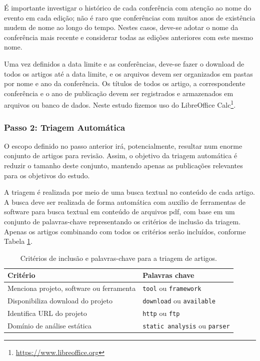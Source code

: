 É importante investigar o histórico de cada conferência com atenção ao nome do
evento em cada edição; não é raro que conferências com muitos anos de
existência mudem de nome ao longo do tempo. Nestes casos, deve-se adotar o nome
da conferência mais recente e considerar todas as edições anteriores com este
mesmo nome.

Uma vez definidos a data limite e as conferências, deve-se fazer o download de
todos os artigos até a data limite, e os arquivos devem ser organizados em pastas
por nome e ano da conferência. Os títulos de todos os artigo, a correspondente
conferência e o ano de publicação devem ser registrados e armazenados em
arquivos ou banco de dados. Neste estudo fizemos uso do
LibreOffice Calc\footnote{\url{https://www.libreoffice.org}}.

\subsubsection{Passo 2: Triagem Automática} \label{estudo1:planejamento:filtro}

O escopo definido no passo anterior irá, potencialmente, resultar num enorme
conjunto de artigos para revisão. Assim, o objetivo da triagem automática é reduzir o tamanho deste
conjunto, mantendo apenas as publicações relevantes para os objetivos do estudo.

A triagem é realizada por meio de uma busca textual no conteúdo de cada artigo. A
busca deve ser realizada de forma automática com auxilio de ferramentas de
software para busca textual em conteúdo de arquivos pdf, com base em um
conjunto de palavras-chave representando os critérios de inclusão da triagem.
Apenas os artigos combinando com todos os critérios serão incluídos, conforme
Tabela \ref{criterios-triagem}.

\begin{table}[h]
\caption{Critérios de inclusão e palavras-chave para a triagem de artigos.}
\centering
\begin{tabular}{ l l }
  \hline
  Critério                                 & Palavras chave                        \\
  \hline
  Menciona projeto, software ou ferramenta & {\tt tool} ou {\tt framework}         \\
  Disponibiliza download do projeto        & {\tt download} ou {\tt available}     \\
  Identifica URL do projeto                & {\tt http} ou {\tt ftp}               \\
  Domínio de análise estática              & {\tt static analysis} ou {\tt parser} \\
  \hline
\end{tabular}
\label{criterios-triagem}
\end{table}

